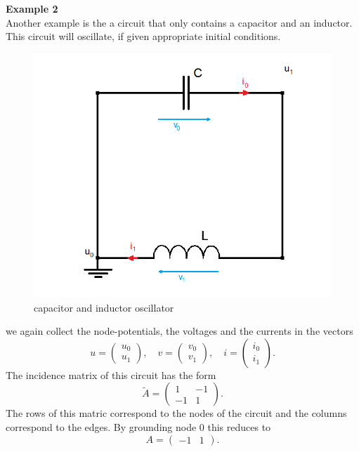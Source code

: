 \textbf{Example 2} \label{ex:LC-circuit incidence matrix} \\
Another example is the a circuit that only contains a capacitor and an inductor. This circuit will oscillate, if given appropriate initial conditions.
\begin{figure}[H]
	\label{circuit:LC-circuit}
	\centering
	\includegraphics[scale=0.5]{pictures/Example2_index0.png}
	\caption{capacitor and inductor oscillator}
\end{figure}

we again collect the node-potentials, the voltages and the currents in the vectors
\begin{displaymath}
	u=
	\left(
	\begin{matrix}
		u_0 \\
		u_1
	\end{matrix}
	\right),
	\quad
	v=
	\left(
	\begin{matrix}
		v_0 \\
		v_1
	\end{matrix}
	\right),
	\quad
	i=
	\left(
	\begin{matrix}
		i_0 \\
		i_1
	\end{matrix}
	\right).
\end{displaymath}
The incidence matrix of this circuit has the form
\begin{displaymath}
	\tilde{A} = 
	\left(
	\begin{matrix}
		1 & -1  \\
		-1 & 1 
	\end{matrix}
	\right).
\end{displaymath}
The rows of this matric correspond to the nodes of the circuit and the columns correspond to the edges. By grounding node 0 this reduces to
\begin{displaymath}
	A = 
	\left(
	\begin{matrix}
		-1 & 1  
	\end{matrix}
	\right).
\end{displaymath}

